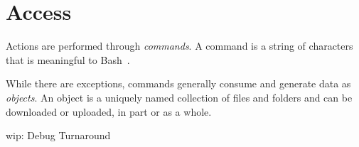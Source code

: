 \section{Access}

Actions are performed through \emph{commands}. A command is a string of characters that is meaningful to Bash~\cite{gnu_bash}. 

While there are exceptions, commands generally consume and generate data as \emph{objects}. An object is a uniquely named collection of files and folders and can be downloaded or uploaded, in part or as a whole.



wip: Debug Turnaround
